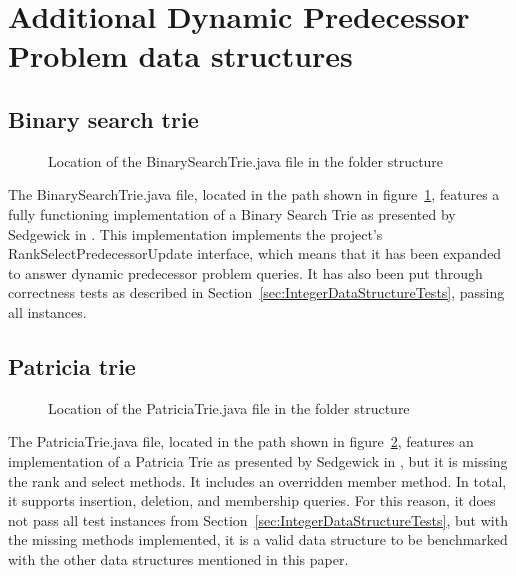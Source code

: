 \section{Additional Dynamic Predecessor Problem data structures}

\subsection{Binary search trie}

\begin{figure}[H]
\caption{Location of the {\ttfamily BinarySearchTrie.java} file in the folder structure}
\label{fig:BinarySearchTrieTree}
\end{figure}

The {\ttfamily BinarySearchTrie.java} file, located in the path shown in figure~\ref{fig:BinarySearchTrieTree}, features a fully functioning implementation of a Binary Search Trie as presented by Sedgewick in \cite{sedgewick2002algorithms}. This implementation implements the project's {\ttfamily RankSelectPredecessorUpdate} interface, which means that it has been expanded to answer dynamic predecessor problem queries. It has also been put through correctness tests as described in Section~\ref{sec:IntegerDataStructureTests}, passing all instances.

\subsection{Patricia trie} \label{sec:PatriciaTrieImplementation}

\begin{figure}[H]
\caption{Location of the {\ttfamily PatriciaTrie.java} file in the folder structure}
\label{fig:PatriciaTrieTree}
\end{figure}

The {\ttfamily PatriciaTrie.java} file, located in the path shown in figure~\ref{fig:PatriciaTrieTree}, features an implementation of a Patricia Trie as presented by Sedgewick in \cite{sedgewick2002algorithms}, but it is missing the {\ttfamily rank} and {\ttfamily select} methods. It includes an overridden {\ttfamily member} method. In total, it supports insertion, deletion, and membership queries. For this reason, it does not pass all test instances from Section~\ref{sec:IntegerDataStructureTests}, but with the missing methods implemented, it is a valid data structure to be benchmarked with the other data structures mentioned in this paper.

